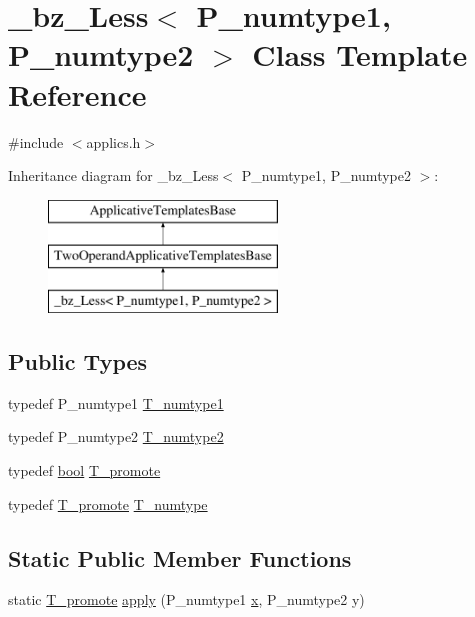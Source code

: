 \hypertarget{class__bz__Less}{}\section{\+\_\+bz\+\_\+\+Less$<$ P\+\_\+numtype1, P\+\_\+numtype2 $>$ Class Template Reference}
\label{class__bz__Less}


{\ttfamily \#include $<$applics.\+h$>$}

Inheritance diagram for \+\_\+bz\+\_\+\+Less$<$ P\+\_\+numtype1, P\+\_\+numtype2 $>$\+:\begin{figure}[H]
\begin{center}
\leavevmode
\includegraphics[height=3.000000cm]{class__bz__Less}
\end{center}
\end{figure}
\subsection*{Public Types}
\begin{DoxyCompactItemize}
\item 
typedef P\+\_\+numtype1 \hyperlink{class__bz__Less_ab67f34fd1451c9ab3e0492d9e9dc775c}{T\+\_\+numtype1}
\item 
typedef P\+\_\+numtype2 \hyperlink{class__bz__Less_a1937c0334894d4bc6f0a4444c2ac8218}{T\+\_\+numtype2}
\item 
typedef \hyperlink{compiler_8h_abb452686968e48b67397da5f97445f5b}{bool} \hyperlink{class__bz__Less_a12a8fd0293fd7172cdfb8607b7218125}{T\+\_\+promote}
\item 
typedef \hyperlink{class__bz__Less_a12a8fd0293fd7172cdfb8607b7218125}{T\+\_\+promote} \hyperlink{class__bz__Less_ae82c5dcb612b5cfef859791956670bd8}{T\+\_\+numtype}
\end{DoxyCompactItemize}
\subsection*{Static Public Member Functions}
\begin{DoxyCompactItemize}
\item 
static \hyperlink{class__bz__Less_a12a8fd0293fd7172cdfb8607b7218125}{T\+\_\+promote} \hyperlink{class__bz__Less_a6c6dffcc86abadbb48b76df413a38527}{apply} (P\+\_\+numtype1 \hyperlink{vecnorm1_8cc_ac73eed9e41ec09d58f112f06c2d6cb63}{x}, P\+\_\+numtype2 y)
\end{DoxyCompactItemize}


